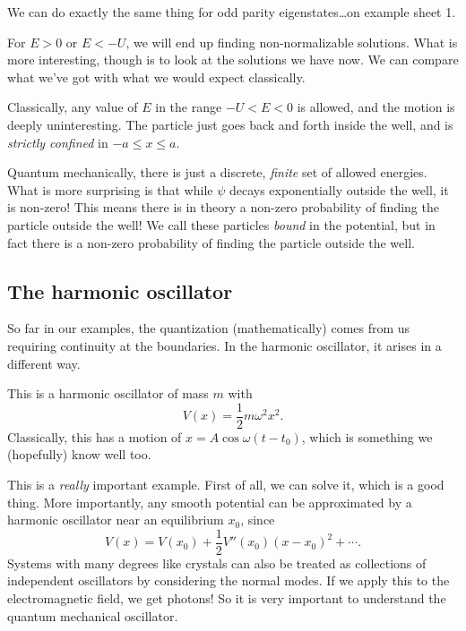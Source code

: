 \documentclass[a4paper]{article}
\begin{document}
We can do exactly the same thing for odd parity eigenstates\ldots on example sheet 1.

For $E > 0$ or $E < -U$, we will end up finding non-normalizable solutions. What is more interesting, though is to look at the solutions we have now. We can compare what we've got with what we would expect classically.

Classically, any value of $E$ in the range $-U < E < 0$ is allowed, and the motion is deeply uninteresting. The particle just goes back and forth inside the well, and is \emph{strictly confined} in $-a \leq x \leq a$.

Quantum mechanically, there is just a discrete, \emph{finite} set of allowed energies. What is more surprising is that while $\psi$ decays exponentially outside the well, it is non-zero! This means there is in theory a non-zero probability of finding the particle outside the well! We call these particles \emph{bound} in the potential, but in fact there is a non-zero probability of finding the particle outside the well.

\subsection{The harmonic oscillator}
So far in our examples, the quantization (mathematically) comes from us requiring continuity at the boundaries. In the harmonic oscillator, it arises in a different way.
\begin{center}
\end{center}
This is a harmonic oscillator of mass $m$ with
\[
  V(x) = \frac{1}{2}m\omega^2 x^2.
\]
Classically, this has a motion of $x = A \cos \omega (t - t_0)$, which is something we (hopefully) know well too.

This is a \emph{really} important example. First of all, we can solve it, which is a good thing. More importantly, any smooth potential can be approximated by a harmonic oscillator near an equilibrium $x_0$, since
\[
  V(x) = V(x_0) + \frac{1}{2}V''(x_0)(x - x_0)^2 + \cdots.
\]
Systems with many degrees like crystals can also be treated as collections of independent oscillators by considering the normal modes. If we apply this to the electromagnetic field, we get photons! So it is very important to understand the quantum mechanical oscillator.
\end{document}
